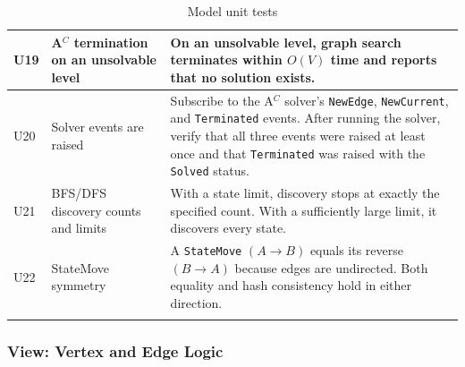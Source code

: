 \begin{center}
\begin{longtable}{ | P{0.05\textwidth} | P{0.30\textwidth} | P{0.55\textwidth} | }
U19
& A$^C$ termination on an unsolvable level
& On an unsolvable level, graph search terminates within $O(V)$ time and reports that no solution exists.
\\ \hline

U20
& Solver events are raised
& Subscribe to the A$^C$ solver's \texttt{NewEdge}, \texttt{NewCurrent}, and \texttt{Terminated} events. After running the solver, verify that all three events were raised at least once and that \texttt{Terminated} was raised with the \texttt{Solved} status.
\\ \hline

U21
& BFS/DFS discovery counts and limits
& With a state limit, discovery stops at exactly the specified count. With a sufficiently large limit, it discovers every state.
\\ \hline

U22
& StateMove symmetry
& A \texttt{StateMove} $(A \to B)$ equals its reverse $(B \to A)$ because edges are undirected. Both equality and hash consistency hold in either direction.
\\ \hline

\caption{Model unit tests}
\label{tab:ut-discoverers}
\end{longtable}
\end{center}

\subsubsection{View: Vertex and Edge Logic}

